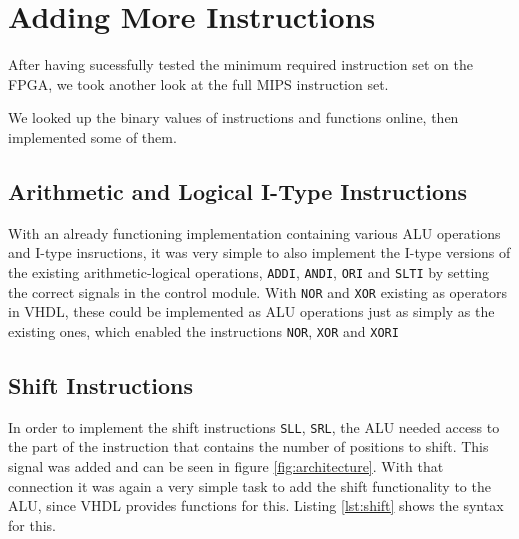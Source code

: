 \section{Adding More Instructions}
\label{sec:more_instructions}
After having sucessfully tested the minimum required instruction set on the FPGA,
we took another look at the full MIPS instruction set.

We looked up the binary values of instructions and functions online\cite{bib:opencores},
then implemented some of them.

\subsection{Arithmetic and Logical I-Type Instructions}
With an already functioning implementation containing various ALU operations and I-type insructions,
it was very simple to also implement the I-type versions of the existing arithmetic-logical operations, \texttt{ADDI}, \texttt{ANDI}, \texttt{ORI} and \texttt{SLTI} by setting the correct signals in the control module.
With \texttt{NOR} and \texttt{XOR} existing as operators in VHDL, these could be implemented as ALU operations just as simply as the existing ones,
which enabled the instructions \texttt{NOR}, \texttt{XOR} and \texttt{XORI}

\subsection{Shift Instructions}
In order to implement the shift instructions \texttt{SLL}, \texttt{SRL},
the ALU needed access to the part of the instruction that contains the number of positions to shift.
This signal was added and can be seen in figure \ref{fig:architecture}.
With that connection it was again a very simple task to add the shift functionality to the ALU, since VHDL provides functions for this.
Listing \ref{lst:shift} shows the syntax for this.

